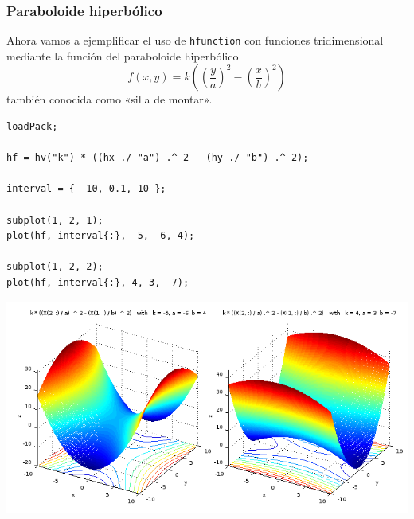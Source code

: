 \documentclass{article}
\begin{document}
\subsubsection{Paraboloide hiperbólico}
Ahora vamos a ejemplificar el uso de \texttt{hfunction} con funciones
tridimensional mediante la función del paraboloide hiperbólico \[
f(x, y) = k\left(\left(\frac{y}{a}\right)^2 - \left(\frac{x}{b}\right) ^ 2\right) \]
también conocida como «silla de montar».

\begin{verbatim}
loadPack;

hf = hv("k") * ((hx ./ "a") .^ 2 - (hy ./ "b") .^ 2);

interval = { -10, 0.1, 10 };

subplot(1, 2, 1);
plot(hf, interval{:}, -5, -6, 4);

subplot(1, 2, 2);
plot(hf, interval{:}, 4, 3, -7);
\end{verbatim}

\begin{center}
\includegraphics[scale=0.5]{figure4.png}
\end{center}
\end{document}
